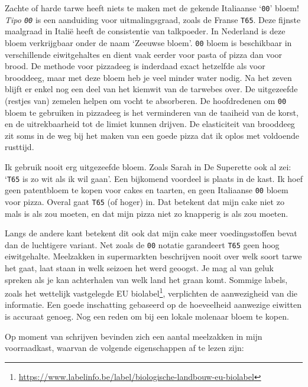 \documentclass[
  11pt,
  dutch,
]{memoir}
\begin{document}
Zachte of harde tarwe heeft niets te maken met de gekende Italiaanse
`\texttt{00}' bloem! \emph{Tipo \texttt{00}} is een aanduiding voor
uitmalingsgraad, zoals de Franse \texttt{T65}. Deze fijnste maalgraad in
Italië heeft de consistentie van talkpoeder. In Nederland is deze bloem
verkrijgbaar onder de naam `Zeeuwse bloem'. \texttt{00} bloem is
beschikbaar in verschillende eiwitgehaltes en dient vaak eerder voor
pasta of pizza dan voor brood. De methode voor pizzadeeg is inderdaad
exact hetzelfde als voor brooddeeg, maar met deze bloem heb je veel
minder water nodig. Na het zeven blijft er enkel nog een deel van het
kiemwit van de tarwebes over. De uitgezeefde (restjes van) zemelen
helpen om vocht te absorberen. De hoofdredenen om \texttt{00} bloem te
gebruiken in pizzadeeg is het verminderen van de taaiheid van de korst,
en de uitrekbaarheid tot de limiet kunnen drijven. De elasticiteit van
brooddeeg zit soms in de weg bij het maken van een goede pizza dat ik
oplos met voldoende rusttijd.

Ik gebruik nooit erg uitgezeefde bloem. Zoals Sarah in De Superette ook
al zei: `\texttt{T65} is zo wit als ik wil gaan'. Een bijkomend voordeel
is plaats in de kast. Ik hoef geen patentbloem te kopen voor cakes en
taarten, en geen Italiaanse \texttt{00} bloem voor pizza. Overal gaat
\texttt{T65} (of hoger) in. Dat betekent dat mijn cake niet zo mals is
als zou moeten, en dat mijn pizza niet zo knapperig is als zou moeten.

Langs de andere kant betekent dit ook dat mijn cake meer voedingsstoffen
bevat dan de luchtigere variant. Net zoals de \texttt{00} notatie
garandeert \texttt{T65} geen hoog eiwitgehalte. Meelzakken in
supermarkten beschrijven nooit over welk soort tarwe het gaat, laat
staan in welk seizoen het werd geoogst. Je mag al van geluk spreken als
je kan achterhalen van welk land het graan komt. Sommige labels, zoals
het wettelijk vastgelegde EU biolabel\footnote{\url{https://www.labelinfo.be/label/biologische-landbouw-eu-biolabel}},
verplichten de aanwezigheid van die informatie. Een goede inschatting
gebaseerd op de hoeveelheid aanwezige eiwitten is accuraat genoeg. Nog
een reden om bij een lokale molenaar bloem te kopen.

Op moment van schrijven bevinden zich een aantal meelzakken in mijn
voorraadkast, waarvan de volgende eigenschappen af te lezen zijn:
\end{document}
